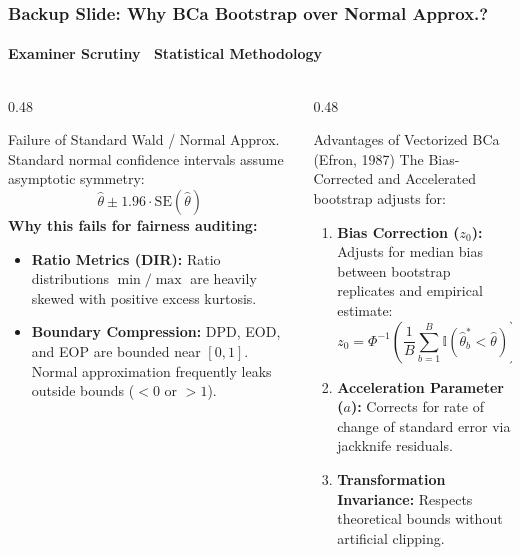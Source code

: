 \begin{frame}
  \frametitle{Backup Slide: Why BCa Bootstrap over Normal Approx.?}
  \framesubtitle{Examiner Scrutiny \textbar\ Statistical Methodology}

  \begin{columns}[T]
    \begin{column}{0.48\textwidth}
      \begin{card}{Failure of Standard Wald / Normal Approx.}
        \scriptsize Standard normal confidence intervals assume asymptotic symmetry:
        $$\hat{\theta} \pm 1.96 \cdot \text{SE}(\hat{\theta})$$
        \textbf{Why this fails for fairness auditing:}
        \begin{itemize}\scriptsize
          \item \textbf{Ratio Metrics (DIR):} Ratio distributions $\min/\max$ are heavily skewed with positive excess kurtosis.
          \item \textbf{Boundary Compression:} DPD, EOD, and EOP are bounded near $[0, 1]$. Normal approximation frequently leaks outside bounds ($< 0$ or $> 1$).
        \end{itemize}
      \end{card}
    \end{column}

    \begin{column}{0.48\textwidth}
      \begin{successcard}{Advantages of Vectorized BCa (Efron, 1987)}
        \scriptsize The Bias-Corrected and Accelerated bootstrap adjusts for:
        \vspace{0.05cm}
        \begin{enumerate}\scriptsize
          \item \textbf{Bias Correction ($z_0$):} Adjusts for median bias between bootstrap replicates and empirical estimate:
          $$z_0 = \Phi^{-1}\left(\frac{1}{B}\sum_{b=1}^B \mathbb{I}(\hat{\theta}^*_b < \hat{\theta})\right)$$
          \item \textbf{Acceleration Parameter ($a$):} Corrects for rate of change of standard error via jackknife residuals.
          \item \textbf{Transformation Invariance:} Respects theoretical bounds without artificial clipping.
        \end{enumerate}
      \end{successcard}
    \end{column}
  \end{columns}
\end{frame}
